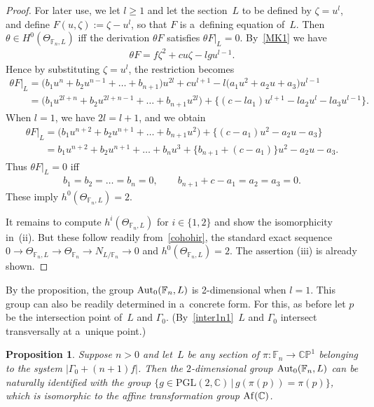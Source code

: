 \documentclass[11pt]{article}
\numberwithin{equation}{section}
\newtheorem{Proposition}[Theorem]{Proposition}
{\theoremstyle{definition}
\newtheorem{Definition}[Theorem]{Definition}
\newtheorem{Remark}[Theorem]{Remark}
}
\begin{document}
\begin{proof}
For later use, we let $l\ge 1$ and let the section~$L$ to be def\/ined by $\zeta = u^l$, and def\/ine $F(u,\zeta):=
\zeta - u^l$, so that $F$ is a~def\/ining equation of~$L$.
Then $\theta\in H^0(\Theta_{\mathbb{F}_n,L})$ if\/f the derivation $\theta F$ satisf\/ies $\theta F|_L = 0$.
By~\eqref{MK1} we have
\begin{gather*}
\theta F = f\zeta^2 + c u \zeta - lgu^{l-1}.
\end{gather*}
Hence by substituting $\zeta = u^l$, the restriction becomes
\begin{gather}
\theta F |_L = \big(b_1 u^n + b_2 u^{n-1} + \dots + b_{n+1}\big) u^{2l} + c u^{l+1} - l \big(a_1 u^2 + a_2 u + a_3\big) u^{l-1}
\nonumber
\\
\phantom{\theta F |_L}{}
= \big(b_1 u^{2l+n} + b_2 u^{2l+n-1} + \dots + b_{n+1}u^{2l}\big) + \big\{(c-la_1) u^{l+1} - la_2 u^l - la_3 u^{l-1}\big\}.
\label{der1}
\end{gather}
When $l=1$, we have $2l = l+1$, and we obtain
\begin{gather*}
\theta F|_L = \big(b_1 u^{n+2} + b_2 u^{n+1} + \dots + b_{n+1}u^{2}\big) + \big\{(c-a_1) u^{2} - a_2 u - a_3 \big\}
\\
\phantom{\theta F|_L}{}
= b_1 u^{n+2} + b_2 u^{n+1} + \dots + b_n u^3 + \{b_{n+1} + (c -a_1)\} u^2 - a_2 u - a_3.
\end{gather*}
Thus $\theta F|_L = 0$ if\/f{\samepage
\begin{gather*}
b_1=b_2=\dots=b_{n} = 0,
\qquad
b_{n+1} + c - a_1 = a_2 = a_3 = 0.
\end{gather*}
These imply $h^0(\Theta_{\mathbb{F}_n, L}) = 2$.}

It remains to compute $h^i(\Theta_{\mathbb{F}_n, L})$ for $i\in \{1,2\}$ and show the isomorphicity in~(ii).
But these follow readily from~\eqref{cohohir}, the standard exact sequence $ 0 \to \Theta_{\mathbb{F}_n, L} \to
\Theta_{\mathbb{F}_n} \to N_{L/\mathbb{F}_n}\to 0$ and $h^0(\Theta_{\mathbb{F}_n, L})=2$.
The assertion (iii) is already shown.
\end{proof}

By the proposition, the group ${\rm{Aut}}_0(\mathbb{F}_n,L)$ is 2-dimensional when $l=1$.
This group can also be readily determined in a~concrete form.
For this, as before let $p$ be the intersection point of~$L$ and $\Gamma_0$.
(By~\eqref{inter1n1}~$L$ and $\Gamma_0$ intersect transversally at a~unique point.)

\begin{Proposition}\label{prop:nonred}
Suppose $n>0$ and let~$L$ be any section of $\pi:\mathbb{F}_n\to \mathbb{CP}^1$ belonging to the system $|\Gamma_0+(n+1)f|$.
Then the $2$-dimensional group ${\rm{Aut}}_0(\mathbb{F}_n, L)$ can be naturally identified with
the group $\{g\in\mathrm{PGL}(2,\mathbb{C}) \,|\, g(\pi(p)) = \pi(p)\}$, which is isomorphic
to the affine transformation group ${\rm Af}(\mathbb{C})$.
\end{Proposition}
\end{document}
